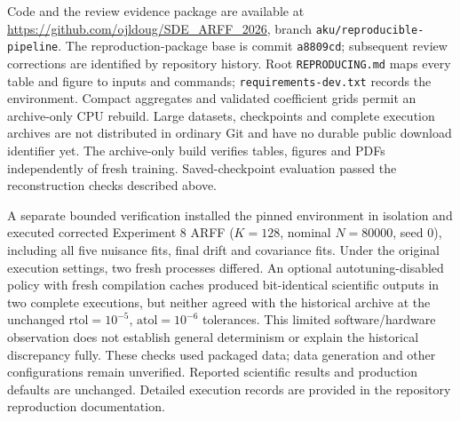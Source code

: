 Code and the review evidence package are available at \url{https://github.com/ojldoug/SDE_ARFF_2026}, branch \texttt{aku/reproducible-pipeline}. The reproduction-package base is commit \texttt{a8809cd}; subsequent review corrections are identified by repository history. Root \texttt{REPRODUCING.md} maps every table and figure to inputs and commands; \texttt{requirements-dev.txt} records the environment. Compact aggregates and validated coefficient grids permit an archive-only CPU rebuild. Large datasets, checkpoints and complete execution archives are not distributed in ordinary Git and have no durable public download identifier yet. The archive-only build verifies tables, figures and PDFs independently of fresh training. Saved-checkpoint evaluation passed the reconstruction checks described above.

A separate bounded verification installed the pinned environment in isolation and executed corrected Experiment 8 ARFF ($K=128$, nominal $N=80000$, seed 0), including all five nuisance fits, final drift and covariance fits. Under the original execution settings, two fresh processes differed. An optional autotuning-disabled policy with fresh compilation caches produced bit-identical scientific outputs in two complete executions, but neither agreed with the historical archive at the unchanged $\mathrm{rtol}=10^{-5}$, $\mathrm{atol}=10^{-6}$ tolerances. This limited software/hardware observation does not establish general determinism or explain the historical discrepancy fully. These checks used packaged data; data generation and other configurations remain unverified. Reported scientific results and production defaults are unchanged. Detailed execution records are provided in the repository reproduction documentation.
